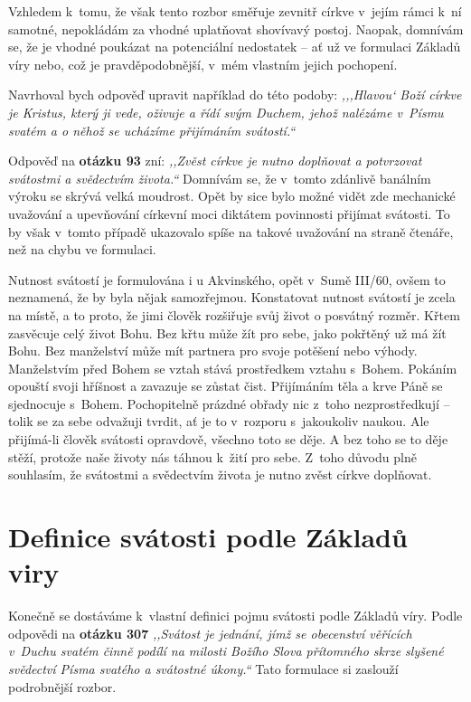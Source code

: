 Vzhledem k~tomu, že však tento rozbor směřuje zevnitř církve v~jejím rámci k~ní
samotné, nepokládám za vhodné uplatňovat shovívavý postoj. Naopak, domnívám se,
že je vhodné poukázat na potenciální nedostatek -- ať už ve formulaci Základů
víry nebo, což je pravděpodobnější, v~mém vlastním jejich pochopení.

Navrhoval bych odpověď upravit například do této podoby: \textit{,,,Hlavou` Boží
církve je Kristus, který ji vede, oživuje a řídí svým Duchem, jehož nalézáme
v~Písmu svatém a o něhož se ucházíme přijímáním svátostí.``}

Odpověď na \textbf{otázku 93} zní: \textit{,,Zvěst církve je nutno doplňovat a potvrzovat
svátostmi a svědectvím života.``} Domnívám se, že v~tomto zdánlivě banálním
výroku se skrývá velká moudrost. Opět by sice bylo možné vidět zde mechanické
uvažování a upevňování církevní moci diktátem povinnosti přijímat svátosti. To
by však v~tomto případě ukazovalo spíše na takové uvažování na straně čtenáře,
než na chybu ve formulaci.

Nutnost svátostí je formulována i u Akvinského, opět v~Sumě III/60, ovšem to
neznamená, že by byla nějak samozřejmou. Konstatovat nutnost svátostí je zcela
na místě, a to proto, že jimi člověk rozšiřuje svůj život o posvátný rozměr.
Křtem zasvěcuje celý život Bohu. Bez křtu může žít pro sebe, jako pokřtěný už má
žít Bohu. Bez manželství může mít partnera pro svoje potěšení nebo výhody.
Manželstvím před Bohem se vztah stává prostředkem vztahu s~Bohem. Pokáním
opouští svoji hříšnost a zavazuje se zůstat čist. Přijímáním těla a krve Páně se
sjednocuje s~Bohem. Pochopitelně prázdné obřady nic z~toho nezprostředkují --
tolik se za sebe odvažuji tvrdit, ať je to v~rozporu s~jakoukoliv naukou. Ale
přijímá-li člověk svátosti opravdově, všechno toto se děje. A bez toho se to
děje stěží, protože naše životy nás táhnou k~žití pro sebe. Z~toho důvodu plně
souhlasím, že svátostmi a svědectvím života je nutno zvěst církve doplňovat.

\section{Definice svátosti podle Základů viry}

Konečně se dostáváme k~vlastní definici pojmu svátosti podle Základů víry. Podle
odpovědi na \textbf{otázku 307}
\textit{,,Svátost je jednání, jímž se obecenství věřících v~Duchu svatém činně
podílí na milosti Božího Slova přítomného skrze slyšené svědectví Písma svatého
a svátostné úkony.``} Tato formulace si zaslouží podrobnější rozbor.

